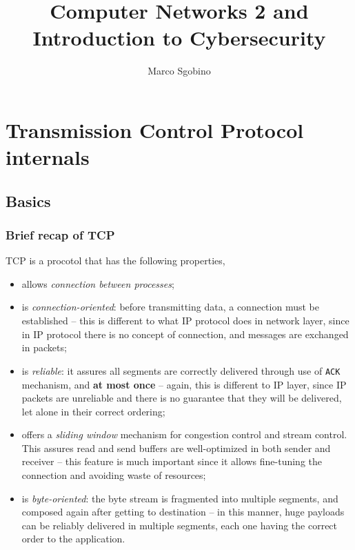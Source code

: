 \documentclass[a4paper, 11pt]{report}
\begin{document}
\title{Computer Networks 2 and Introduction to Cybersecurity}
\author{Marco Sgobino}
\maketitle
\tableofcontents

\part{Transmission Control Protocol internals}

\chapter{Basics}

\section{Brief recap of TCP}
TCP is a procotol that has the following properties,

\begin{itemize}
	\item allows \emph{connection between processes};
	\item is \emph{connection-oriented}: before transmitting data, a
		connection must be established \--- this is different to what
		IP protocol does in network layer, since in IP protocol there
		is no concept of connection, and messages are exchanged in
		packets;
	\item is \emph{reliable}: it assures all segments are correctly
		delivered through use of \texttt{ACK} mechanism, and \textbf{at
		most once} \--- again, this is different to IP layer, since IP
		packets are unreliable and there is no guarantee that they will
		be delivered, let alone in their correct ordering;
	\item offers a \emph{sliding window} mechanism for congestion control
		and stream control. This assures read and send buffers are
		well-optimized in both sender and receiver \--- this feature is
		much important since it allows fine-tuning the connection and
		avoiding waste of resources;
	\item is \emph{byte-oriented}: the byte stream is fragmented into
		multiple segments, and composed again after getting to
		destination \--- in this manner, huge payloads can be reliably
		delivered in multiple segments, each one having the correct
		order to the application.
\end{itemize}
\end{document}
